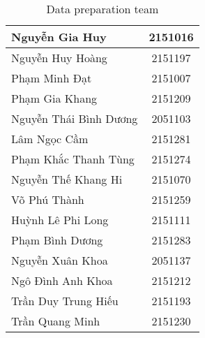 \begin{table}[ht]
\begin{tabular}{|l|c|}
         Nguyễn Gia Huy & 2151016 \\
         \hline
         Nguyễn Huy Hoàng & 2151197 \\
         \hline
         Phạm Minh Đạt & 2151007 \\
         \hline
         Phạm Gia Khang & 2151209 \\
         \hline
         Nguyễn Thái Bình Dương & 2051103 \\
         \hline
         Lâm Ngọc Cầm & 2151281 \\
         \hline
         Phạm Khắc Thanh Tùng & 2151274 \\
         \hline
         Nguyễn Thế Khang Hi & 2151070 \\
         \hline
         Võ Phú Thành & 2151259 \\
         \hline
         Huỳnh Lê Phi Long & 2151111 \\
         \hline
         Phạm Bình Dương & 2151283 \\
         \hline
         Nguyễn Xuân Khoa & 2051137 \\
         \hline
         Ngô Đình Anh Khoa & 2151212 \\
         \hline
         Trần Duy Trung Hiếu & 2151193 \\
         \hline
         Trần Quang Minh & 2151230 \\
         \hline
    \end{tabular}
    \caption{Data preparation team}
    \label{tab:my_label}
\end{table}